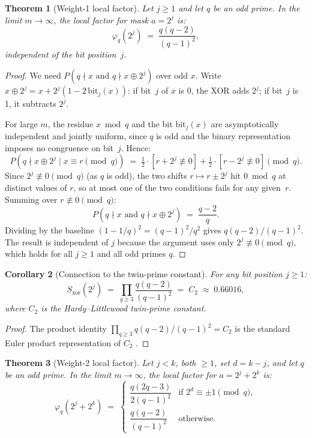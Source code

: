 \documentclass[11pt]{article}
\newtheorem{theorem}{Theorem}
\newtheorem{corollary}[theorem]{Corollary}
\begin{document}
\begin{theorem}[Weight-1 local factor]
\label{thm:weight1}
Let $j \geq 1$ and let $q$ be an odd prime.
In the limit $m \to \infty$, the local factor for mask $a = 2^j$ is:
\[
  \varphi_q(2^j)
  \;=\;
  \frac{q(q-2)}{(q-1)^2},
\]
independent of the bit position~$j$.
\end{theorem}

\begin{proof}
We need $P(q \nmid x \text{ and } q \nmid x \oplus 2^j)$ over odd $x$.
Write $x \oplus 2^j = x + 2^j(1 - 2\,\mathrm{bit}_j(x))$: if bit~$j$ of $x$ is 0,
the XOR adds $2^j$; if bit~$j$ is 1, it subtracts $2^j$.

For large $m$, the residue $x \bmod q$ and the bit $\mathrm{bit}_j(x)$
are asymptotically independent and jointly uniform, since $q$ is odd
and the binary representation imposes no congruence on bit~$j$.
Hence:
\[
  P(q \nmid x \oplus 2^j \mid x \equiv r \pmod{q})
  \;=\;
  \tfrac{1}{2} \cdot [r + 2^j \not\equiv 0] + \tfrac{1}{2} \cdot [r - 2^j \not\equiv 0]
  \pmod{q}.
\]
Since $2^j \not\equiv 0 \pmod{q}$ (as $q$ is odd), the two shifts
$r \mapsto r \pm 2^j$ hit $0 \bmod q$ at distinct values of $r$,
so at most one of the two conditions fails for any given~$r$.
Summing over $r \not\equiv 0 \pmod{q}$:
\[
  P(q \nmid x \text{ and } q \nmid x \oplus 2^j)
  \;=\;
  \frac{q-2}{q}.
\]
Dividing by the baseline $(1 - 1/q)^2 = (q-1)^2/q^2$ gives $q(q-2)/(q-1)^2$.
The result is independent of $j$ because the argument uses only
$2^j \not\equiv 0 \pmod{q}$, which holds for all $j \geq 1$
and all odd primes $q$.
\end{proof}

\begin{corollary}[Connection to the twin-prime constant]
\label{cor:C2}
For any bit position $j \geq 1$:
\[
  S_{\mathrm{xor}}(2^j)
  \;=\;
  \prod_{q \geq 3} \frac{q(q-2)}{(q-1)^2}
  \;=\;
  C_2
  \;\approx\;
  0.66016,
\]
where $C_2$ is the Hardy--Littlewood twin-prime constant.
\end{corollary}

\begin{proof}
The product identity $\prod_{q \geq 3} q(q-2)/(q-1)^2 = C_2$
is the standard Euler product representation of $C_2$
\cite{hardylittlewood1923}.
\end{proof}

\begin{theorem}[Weight-2 local factor]
\label{thm:weight2}
Let $j < k$, both $\geq 1$, set $d = k - j$, and let $q$ be an odd prime.
In the limit $m \to \infty$, the local factor for $a = 2^j + 2^k$ is:
\[
  \varphi_q(2^j + 2^k)
  \;=\;
  \begin{cases}
    \dfrac{q(2q-3)}{2(q-1)^2}
    & \text{if } 2^d \equiv \pm 1 \pmod{q}, \\[8pt]
    \dfrac{q(q-2)}{(q-1)^2}
    & \text{otherwise.}
  \end{cases}
\]
\end{theorem}
\end{document}
